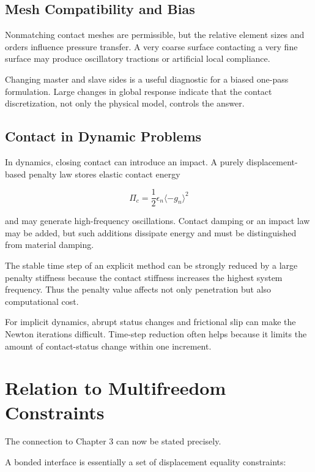 \subsection{Mesh Compatibility and Bias}

Nonmatching contact meshes are permissible, but the relative element sizes and
orders influence pressure transfer. A very coarse surface contacting a very fine
surface may produce oscillatory tractions or artificial local compliance.

Changing master and slave sides is a useful diagnostic for a biased one-pass
formulation. Large changes in global response indicate that the contact
discretization, not only the physical model, controls the answer.

\subsection{Contact in Dynamic Problems}

In dynamics, closing contact can introduce an impact. A purely displacement-based
penalty law stores elastic contact energy

\begin{equation}
    \Pi_c = \frac{1}{2}\epsilon_n \langle -g_n \rangle^2
\end{equation}

and may generate high-frequency oscillations. Contact damping or an impact law
may be added, but such additions dissipate energy and must be distinguished from
material damping.

The stable time step of an explicit method can be strongly reduced by a large
penalty stiffness because the contact stiffness increases the highest system
frequency. Thus the penalty value affects not only penetration but also
computational cost.

For implicit dynamics, abrupt status changes and frictional slip can make the
Newton iterations difficult. Time-step reduction often helps because it limits
the amount of contact-status change within one increment.

\section{Relation to Multifreedom Constraints}

The connection to Chapter 3 can now be stated precisely.

A bonded interface is essentially a set of displacement equality constraints:

